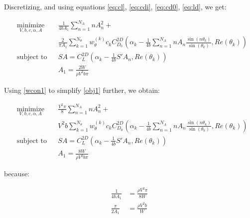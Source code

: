 \documentclass[letterpaper,12pt]{article}
\begin{document}
Discretizing, and using equations \ref{eq:cl}, \ref{eq:cdi}, \ref{eq:cd0}, \ref{eq:ld}, we get:


\begin{align}
	& \underset{V, b, c, \alpha, A}{\text{minimize}}
	& & \frac {1}{4bA_1} \sum_{n=1}^{N_A} n A_{n}^2 + \nonumber \\
	&&& \frac 2 {\pi A_1} \sum_{k=1}^{N_{\theta}} w_{\theta}^{(k)} c_k C_{D_0}^{2D}\left( 
		\alpha_k - 
		\frac {1}{4b} \sum_{n=1}^{N_A} n A_n \frac{ \sin(n\theta_k) }{\sin(\theta_k)} , Re(\theta_k)
		\right) \label{obj1} \\
	& \text{subject to}
	& & SA =  C_L^{2D} \left( \alpha_k - \frac {1}{4b} S' A_n , Re(\theta_k)\right)  \label{llcon1}\\
	& &  & A_1 = \frac{2W}{\rho V^2 b \pi} \label{wcon1}
\end{align}

Using \ref{wcon1} to simplify \ref{obj1} further, we obtain:

\begin{align}
	& \underset{V, b, c, \alpha, A}{\text{minimize}}
	& & \frac{V^2 \pi}{8}\sum_{n=1}^{N_A} n A_{n}^2 + \nonumber \\
	&&&  V^2 b  \sum_{k=1}^{N_{\theta}} w_{\theta}^{(k)} c_k C_{D_0}^{2D}\left( 
		\alpha_k - 
		\frac {1}{4b} \sum_{n=1}^{N_A} n A_n \frac{ \sin(n\theta_k) }{\sin(\theta_k)} , Re(\theta_k)
		\right) \label{obj2} \\
	& \text{subject to}
	& & SA =  C_L^{2D} \left( \alpha_k - \frac {1}{4b} S' A_n , Re(\theta_k)\right)  \label{llcon2}\\
	& &  & A_1 = \frac{8W}{\rho V^2 b \pi} \label{wcon2}
\end{align}

because:

\begin{align*}
	\frac{1}{4bA_1} &= \frac{\rho V^2 \pi}{8W} \\
	\frac{\pi}{2A_1} &= \frac{\rho V^2 b}{ W} 
\end{align*}

\end{document}
